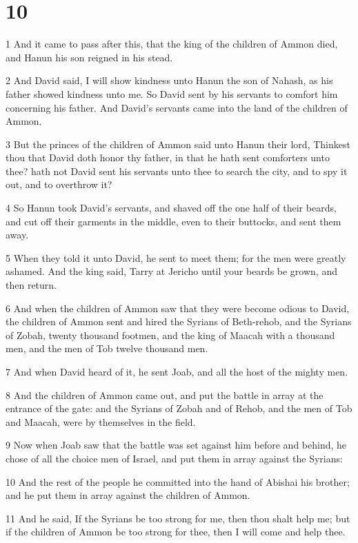 \chapter{10}

\par 1 And it came to pass after this, that the king of the children of Ammon died, and Hanun his son reigned in his stead.
\par 2 And David said, I will show kindness unto Hanun the son of Nahash, as his father showed kindness unto me. So David sent by his servants to comfort him concerning his father. And David's servants came into the land of the children of Ammon.
\par 3 But the princes of the children of Ammon said unto Hanun their lord, Thinkest thou that David doth honor thy father, in that he hath sent comforters unto thee? hath not David sent his servants unto thee to search the city, and to spy it out, and to overthrow it?
\par 4 So Hanun took David's servants, and shaved off the one half of their beards, and cut off their garments in the middle, even to their buttocks, and sent them away.
\par 5 When they told it unto David, he sent to meet them; for the men were greatly ashamed. And the king said, Tarry at Jericho until your beards be grown, and then return.
\par 6 And when the children of Ammon saw that they were become odious to David, the children of Ammon sent and hired the Syrians of Beth-rehob, and the Syrians of Zobah, twenty thousand footmen, and the king of Maacah with a thousand men, and the men of Tob twelve thousand men.
\par 7 And when David heard of it, he sent Joab, and all the host of the mighty men.
\par 8 And the children of Ammon came out, and put the battle in array at the entrance of the gate: and the Syrians of Zobah and of Rehob, and the men of Tob and Maacah, were by themselves in the field.
\par 9 Now when Joab saw that the battle was set against him before and behind, he chose of all the choice men of Israel, and put them in array against the Syrians:
\par 10 And the rest of the people he committed into the hand of Abishai his brother; and he put them in array against the children of Ammon.
\par 11 And he said, If the Syrians be too strong for me, then thou shalt help me; but if the children of Ammon be too strong for thee, then I will come and help thee.

